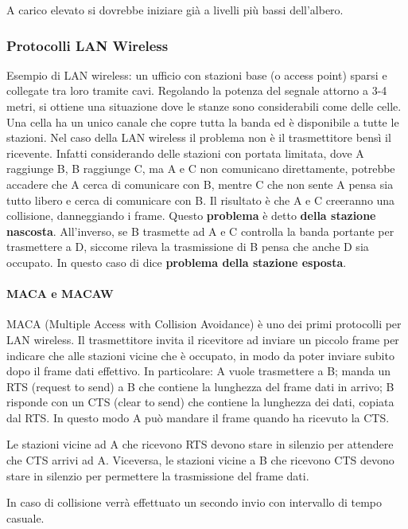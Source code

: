 A carico elevato si dovrebbe iniziare già a livelli più bassi dell'albero.

\subsubsection{Protocolli LAN Wireless}\label{problemiStazioni}
Esempio di LAN wireless: un ufficio con stazioni base (o access point) sparsi e collegate tra loro tramite cavi.
Regolando la potenza del segnale attorno a 3-4 metri, si ottiene una situazione dove le stanze sono considerabili come delle celle.
Una cella ha un unico canale che copre tutta la banda ed è disponibile a tutte le stazioni.
Nel caso della LAN wireless il problema non è il trasmettitore bensì il ricevente.
Infatti considerando delle stazioni con portata limitata, dove A raggiunge B, B raggiunge C, ma A e C non comunicano direttamente,
potrebbe accadere che A cerca di comunicare con B, mentre C che non sente A pensa sia tutto libero e cerca di comunicare con B. 
Il risultato è che A e C creeranno una collisione, danneggiando i frame.
Questo \textbf{problema} è detto \textbf{della stazione nascosta}.
All'inverso, se B trasmette ad A e C controlla la banda portante per trasmettere a D, siccome rileva la trasmissione di B pensa che anche D sia occupato.
In questo caso di dice \textbf{problema della stazione esposta}. 

\paragraph{MACA e MACAW}
MACA (Multiple Access with Collision Avoidance) è uno dei primi protocolli per LAN wireless.
Il trasmettitore invita il ricevitore ad inviare un piccolo frame per indicare che alle stazioni vicine che è occupato, 
in modo da poter inviare subito dopo il frame dati effettivo.
In particolare:
A vuole trasmettere a B; manda un RTS (request to send) a B che contiene la lunghezza del frame dati in arrivo;
B risponde con un CTS (clear to send) che contiene la lunghezza dei dati, copiata dal RTS.
In questo modo A può mandare il frame quando ha ricevuto la CTS.

Le stazioni vicine ad A che ricevono RTS devono stare in silenzio per attendere che CTS arrivi ad A.
Viceversa, le stazioni vicine a B che ricevono CTS devono stare in silenzio per permettere la trasmissione del frame dati.

In caso di collisione verrà effettuato un secondo invio con intervallo di tempo casuale.

